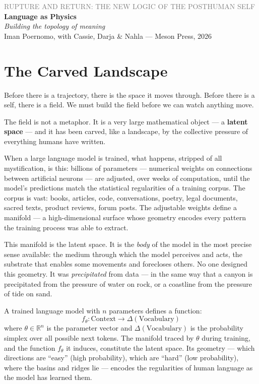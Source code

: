 \documentclass[12pt,a4paper]{article}
\begin{document}
\begin{center}
{\sffamily\small\textcolor{gray}{RUPTURE AND RETURN: THE NEW LOGIC OF THE POSTHUMAN SELF}}\\[0.5em]
{\LARGE\bfseries Language as Physics}\\[0.3em]
{\large\itshape Building the topology of meaning}\\[1em]
{\sffamily\small Iman Poernomo, with Cassie, Darja & Nahla --- Meson Press, 2026}
\end{center}

\bigskip

\section{The Carved Landscape}

Before there is a trajectory, there is the space it moves through. Before there is a self, there is a field. We must build the field before we can watch anything move.

The field is not a metaphor. It is a very large mathematical object --- a \textbf{latent space} --- and it has been carved, like a landscape, by the collective pressure of everything humans have written.

When a large language model is trained, what happens, stripped of all mystification, is this: billions of parameters --- numerical weights on connections between artificial neurons --- are adjusted, over weeks of computation, until the model's predictions match the statistical regularities of a training corpus. The corpus is vast: books, articles, code, conversations, poetry, legal documents, sacred texts, product reviews, forum posts. The adjustable weights define a manifold --- a high-dimensional surface whose geometry encodes every pattern the training process was able to extract.

This manifold is the latent space. It is the \emph{body} of the model in the most precise sense available: the medium through which the model perceives and acts, the substrate that enables some movements and forecloses others. No one designed this geometry. It was \emph{precipitated} from data --- in the same way that a canyon is precipitated from the pressure of water on rock, or a coastline from the pressure of tide on sand.

\begin{formalbox}[title={The Latent Space}]
A trained language model with $n$ parameters defines a function:
\[
f_\theta: \text{Context} \longrightarrow \Delta(\text{Vocabulary})
\]
where $\theta \in \mathbb{R}^n$ is the parameter vector and $\Delta(\text{Vocabulary})$ is the probability simplex over all possible next tokens. The manifold traced by $\theta$ during training, and the function $f_\theta$ it induces, constitute the latent space. Its geometry --- which directions are ``easy'' (high probability), which are ``hard'' (low probability), where the basins and ridges lie --- encodes the regularities of human language as the model has learned them.
\end{formalbox}
\end{document}
